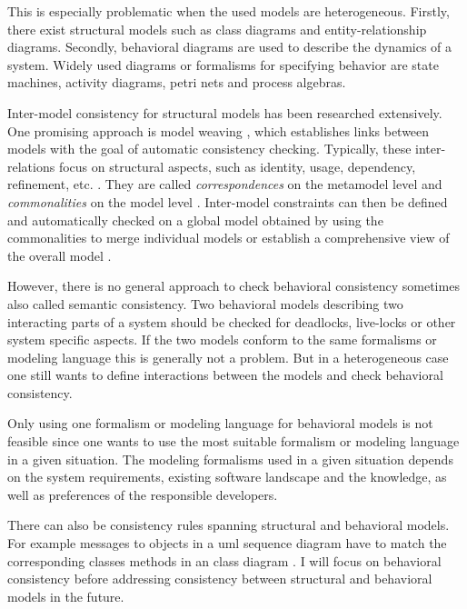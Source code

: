 \documentclass[conference]{IEEEtran}
\begin{document}
This is especially problematic when the used models are heterogeneous.
Firstly, there exist structural models such as class diagrams and entity-relationship diagrams.
Secondly, behavioral diagrams are used to describe the dynamics of a system.
Widely used diagrams or formalisms for specifying behavior are state machines, activity diagrams, petri nets and process algebras.

Inter-model consistency for structural models has been researched extensively.
One promising approach is model weaving \cite{bezivinCanonicalSchemeModel2006}, which establishes links between models with the goal of automatic consistency checking.
Typically, these inter-relations focus on structural aspects, such as identity, usage, dependency, refinement, etc. \cite{feldmannManagingIntermodelInconsistencies2019, torresSystematicLiteratureReview2020}.
They are called \textit{correspondences} on the metamodel level and \textit{commonalities} on the model level \cite{stunkelMultipleModelSynchronization2020, klareCommonalitiesPreservingConsistency2019}.
Inter-model constraints can then be defined and automatically checked on a global model obtained by using the commonalities to merge individual models \cite{stunkelMultimodelCorrespondenceIntermodel2018} or establish a comprehensive view of the overall model \cite{stunkelMultipleModelSynchronization2020}.

However, there is no general approach to check behavioral consistency sometimes also called semantic consistency.
Two behavioral models describing two interacting parts of a system should be checked for deadlocks, live-locks or other system specific aspects.
If the two models conform to the same formalisms or modeling language this is generally not a problem.
But in a heterogeneous case one still wants to define interactions between the models and check behavioral consistency.

Only using one formalism or modeling language for behavioral models is not feasible since one wants to use the most suitable formalism or modeling language in a given situation.
The modeling formalisms used in a given situation depends on the system requirements, existing software landscape and the knowledge, as well as preferences of the responsible developers. 

There can also be consistency rules spanning structural and behavioral models.
For example messages to objects in a \gls{uml} sequence diagram have to match the corresponding classes methods in an class diagram \cite{egyedFixingInconsistenciesUML2007}.
I will focus on behavioral consistency before addressing consistency between structural and behavioral models in the future. 
\end{document}
